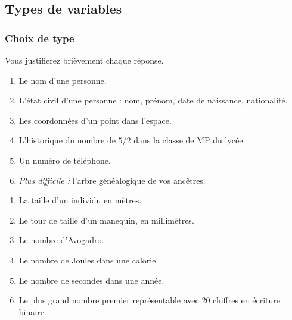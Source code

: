 \ifprof
\vspace{1cm}
\else
\begin{multicols}{2}
\fi

\subsection*{Types de variables}
\subsubsection*{Choix de type}

Vous justifierez brièvement chaque réponse. 

\begin{enumerate}[label = \emph{\alph*)}]
  \item Le nom d'une personne.
  \item L'état civil d'une personne : nom, prénom, date de naissance, nationalité.
  \item Les coordonnées d'un point dans l'espace.
  \item L'historique du nombre de $5/2$ dans la classe de MP du lycée. 
  \item Un numéro de téléphone. 
  \item \emph{Plus difficile :} l'arbre généalogique de vos ancêtres. 
\end{enumerate}



\begin{enumerate}[label=\emph{\alph*)}]
  \item La taille d'un individu en mètres. 
  \item Le tour de taille d'un manequin, en millimètres.
  \item Le nombre d'Avogadro.
  \item Le nombre de Joules dans une calorie.
  \item Le nombre de secondes dans une année.
  \item Le plus grand nombre premier représentable avec 20 chiffres en écriture binaire.
\end{enumerate}


\end{multicols}
